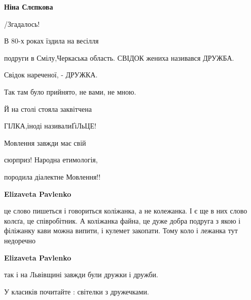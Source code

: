 \begin{itemize}
\begin{itemize}
 
\textbf{Ніна Слєпкова} 

/Згадалось!

В 80-х роках їздила на весілля

подруги в Смілу,Черкаська область. СВІДОК жениха називався ДРУЖБА.

Свідок нареченої, - ДРУЖКА.

Так там було прийнято, не вами, не мною.

Й на столі стояла заквітчена

ГІЛКА,іноді називалиҐіЛьЦЕ!

Мовлення завжди має свій

сюрприз! Народна етимологія,

породила діалектне Мовлення!!

 
\textbf{Elizaveta Pavlenko} 

це слово пишеться і говориться коліжанка, а не колежанка. І є ще в них слово
колєґа, це співробітник. А коліжанка файна, це дуже добра подруга з якою і
філіжанку кави можна випити, і кулемет закопати. Тому коло і лежанка тут
недоречно

 
\textbf{Elizaveta Pavlenko} 

так і на Львівщині завжди були дружки і дружби.

У класиків почитайте : світелки з дружечками.

 

\end{itemize}
\end{itemize}
